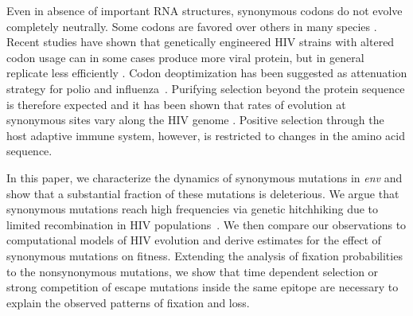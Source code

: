 \documentclass[rmp, twocolumn]{revtex4}
\newcommand{\env}{\textit{env}}
\begin{document}
Even in absence of important RNA structures, synonymous codons do not evolve
completely neutrally. Some codons are favored over others in many species
\citep{plotkin_synonymous_2011}. Recent studies have shown that genetically
engineered HIV strains with altered codon usage can in some cases produce more
viral protein, but in general replicate less efficiently
\citep{ngumbela_quantitative_2008, li_codon-usage-based_2012,
keating_rich_2009}. Codon deoptimization has been suggested as attenuation
strategy for polio and influenza~\citep{mueller_live_2010,coleman_virus_2008}.
Purifying selection beyond the protein sequence is therefore expected
\citep{forsdyke_reciprocal_1995,snoeck_mapping_2011} and it has been shown that
rates of evolution at synonymous sites vary along the HIV genome
\citep{mayrose_towards_2007}. Positive selection through the host adaptive
immune system, however, is restricted to changes in the amino acid sequence.

In this paper, we characterize the dynamics of synonymous mutations in \env{}
and show that a substantial fraction of these mutations is deleterious.  We
argue that synonymous mutations reach high frequencies via genetic hitchhiking
due to limited recombination in HIV populations~\citep{neher_recombination_2010,
batorsky_estimate_2011}. We then compare our observations to computational
models of HIV evolution and derive estimates for the effect of synonymous mutations
 on fitness.  Extending the analysis of fixation probabilities to the
nonsynonymous mutations, we show that time dependent selection or strong
competition of escape mutations inside the same epitope are necessary to explain
the observed patterns of fixation and loss.

\end{document}
